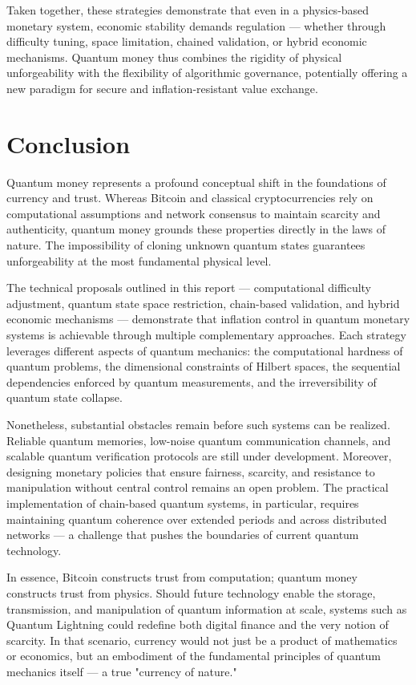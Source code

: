 \documentclass[a4paper,10.5pt,twoside]{article}
\begin{document}
Taken together, these strategies demonstrate that even in a physics-based monetary system, economic stability demands regulation — whether through difficulty tuning, space limitation, chained validation, or hybrid economic mechanisms. Quantum money thus combines the rigidity of physical unforgeability with the flexibility of algorithmic governance, potentially offering a new paradigm for secure and inflation-resistant value exchange.

\section{Conclusion}\label{s:4}
Quantum money represents a profound conceptual shift in the foundations of currency and trust. Whereas Bitcoin and classical cryptocurrencies rely on computational assumptions and network consensus to maintain scarcity and authenticity, quantum money grounds these properties directly in the laws of nature. The impossibility of cloning unknown quantum states guarantees unforgeability at the most fundamental physical level.

The technical proposals outlined in this report — computational difficulty adjustment, quantum state space restriction, chain-based validation, and hybrid economic mechanisms — demonstrate that inflation control in quantum monetary systems is achievable through multiple complementary approaches. Each strategy leverages different aspects of quantum mechanics: the computational hardness of quantum problems, the dimensional constraints of Hilbert spaces, the sequential dependencies enforced by quantum measurements, and the irreversibility of quantum state collapse.

Nonetheless, substantial obstacles remain before such systems can be realized. Reliable quantum memories, low-noise quantum communication channels, and scalable quantum verification protocols are still under development. Moreover, designing monetary policies that ensure fairness, scarcity, and resistance to manipulation without central control remains an open problem. The practical implementation of chain-based quantum systems, in particular, requires maintaining quantum coherence over extended periods and across distributed networks — a challenge that pushes the boundaries of current quantum technology.

In essence, Bitcoin constructs trust from computation; quantum money constructs trust from physics. Should future technology enable the storage, transmission, and manipulation of quantum information at scale, systems such as Quantum Lightning could redefine both digital finance and the very notion of scarcity. In that scenario, currency would not just be a product of mathematics or economics, but an embodiment of the fundamental principles of quantum mechanics itself — a true "currency of nature."

\printbibliography
\end{document}
